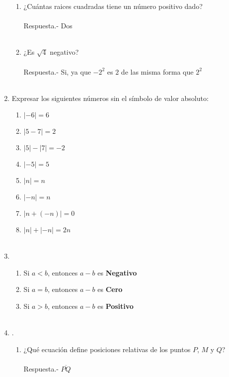 \begin{enumerate}
\begin{enumerate}[\bfseries (a)]
\item ¿Cuántas raices cuadradas tiene un número positivo dado?\\\\
Respuesta.- \; Dos\\\\

\item ¿Es $\sqrt{4}$ negativo?\\\\
Respuesta.- \; Si, ya que $-2^2 $ es $2$ de las misma forma que $2^2$\\\\
\end{enumerate}

\item Expresar los siguientes números sin el símbolo de valor absoluto:
\begin{enumerate}[\bfseries (a)]
\item $|-6| = 6$
\item $|5-7| = 2$
\item $|5|-|7| = -2$
\item $|-5| = 5$
\item $|n| = n$
\item $|-n| = n$
\item $|n+(-n)| = 0$
\item $|n| + |-n| = 2n$\\\\
\end{enumerate}

\item 
\begin{enumerate}[\bfseries (a)]
\item Si $a<b$, entonces $a-b$ es \textbf{Negativo}
\item Si $a=b$, entonces $a-b$ es \textbf{Cero}
\item Si $a>b$, entonces $a-b$ es \textbf{Positivo}\\\\
\end{enumerate}

\item .
\begin{center}
\end{center}
\begin{enumerate}[\bfseries (a)]
\item ¿Qué ecuación define posiciones relativas de los puntos $P$, $M$ y $Q$?\\\\
Respuesta.- \; $\overline{PQ}$\\\\


\end{enumerate}
\end{enumerate}

